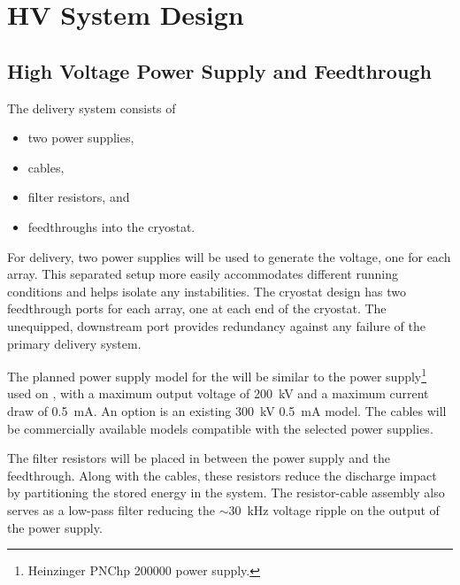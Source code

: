 \section{HV System Design}
\label{sec:fdsp-hv-design}

\subsection {High Voltage Power Supply and Feedthrough}
The  delivery system consists of
\begin{itemize}
\item two power supplies,
\item {} cables,
\item filter resistors, and
\item {} feedthroughs into the cryostat.
\end{itemize}

For  delivery, two power supplies will be used to generate the voltage, one for each  array. 
This separated setup more easily accommodates different running conditions and helps isolate any instabilities. %
The cryostat design has two feedthrough ports for each  array, one at each end of the cryostat. The unequipped, downstream port provides redundancy against any failure of the primary  delivery system. 

The planned power supply model for the  will be similar to the power supply\footnote{Heinzinger\texttrademark{} PNChp 200000 power supply.} used on , with a maximum output voltage of \SI{200}{kV} and a maximum current draw of \SI{0.5}{mA}.  An %
option is an existing \SI{300}{kV} \SI{0.5}{mA} model. The  cables will be commercially available models compatible with the selected power supplies. 


The filter resistors will be placed in between the power supply and the feedthrough.  Along with the cables, these resistors reduce the discharge impact by partitioning the stored energy in the system.  The resistor-cable assembly also serves as a low-pass filter reducing the $\sim$\SI{30}{kHz} voltage ripple on the output of the power supply.

